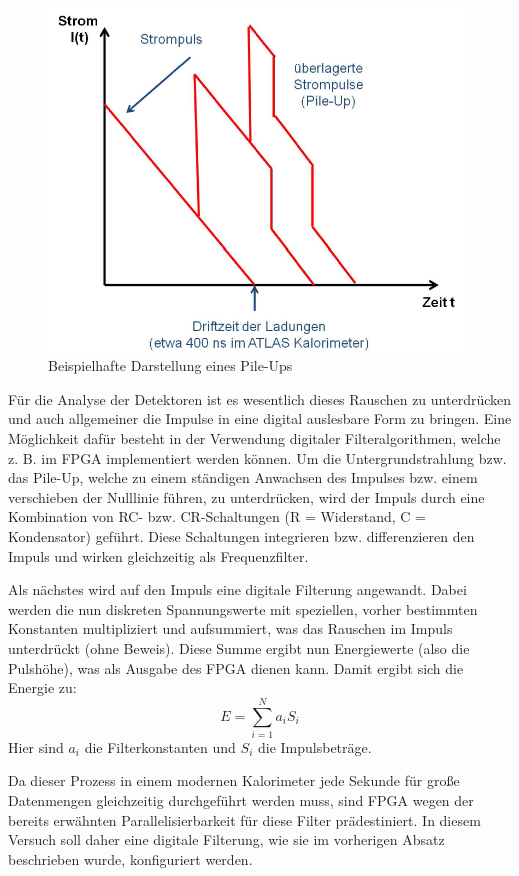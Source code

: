 \begin{figure}[h]
  \includegraphics[width=\linewidth]{../Daten/pileup.png}
  \caption{Beispielhafte Darstellung eines Pile-Ups}
  \label{pileup}
\end{figure}
Für die Analyse der Detektoren ist es wesentlich dieses Rauschen zu unterdrücken und auch allgemeiner die Impulse in eine digital auslesbare Form zu bringen.
Eine Möglichkeit dafür besteht in der Verwendung digitaler Filteralgorithmen, welche z. B. im FPGA implementiert werden können.
Um die Untergrundstrahlung bzw. das Pile-Up, welche zu einem ständigen Anwachsen des Impulses bzw. einem verschieben der Nulllinie führen, zu unterdrücken, wird der Impuls durch eine Kombination von RC- bzw. CR-Schaltungen (R = Widerstand, C = Kondensator) geführt.
Diese Schaltungen \glqq integrieren\grqq{} bzw. \glqq differenzieren\grqq{} den Impuls und wirken gleichzeitig als Frequenzfilter.

Als nächstes wird auf den Impuls eine \glqq digitale Filterung\grqq{} angewandt.
Dabei werden die nun diskreten Spannungswerte mit speziellen, vorher bestimmten Konstanten multipliziert und aufsummiert, was das Rauschen im Impuls unterdrückt (ohne Beweis).
Diese Summe ergibt nun Energiewerte (also die Pulshöhe), was als Ausgabe des FPGA dienen kann.
Damit ergibt sich die Energie zu:
\begin{equation}
E = \sum_{i = 1}^{N} a_i S_i
\end{equation}
Hier sind $a_i$ die Filterkonstanten und $S_i$ die Impulsbeträge.

Da dieser Prozess in einem modernen Kalorimeter jede Sekunde für große Datenmengen gleichzeitig durchgeführt werden muss, sind FPGA wegen der bereits erwähnten Parallelisierbarkeit für diese Filter prädestiniert.
In diesem Versuch soll daher eine digitale Filterung, wie sie im vorherigen Absatz beschrieben wurde, konfiguriert werden.


